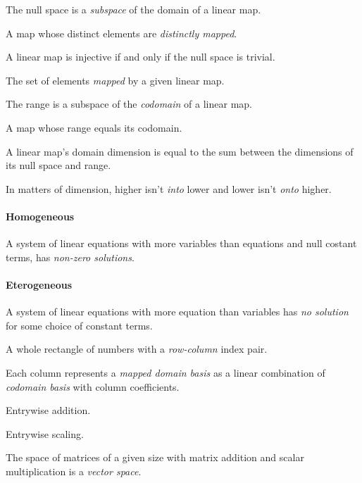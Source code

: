 \begin{multicols}{3}
  The null space is a \textit{subspace} of the domain of a linear map.

  A map whose distinct elements are \textit{distinctly mapped}.

  A linear map is injective if and only if the null space is trivial.

  The set of elements \textit{mapped} by a given linear map.

  The range is a subspace of the \textit{codomain} of a linear map.

  A map whose range equals its codomain.

  A linear map's domain dimension is equal to the sum between the dimensions of its null space and range.

  In matters of dimension, higher isn't \textit{into} lower and lower isn't \textit{onto} higher.

  \paragraph{\textbf{Homogeneous}}
  A system of linear equations with more variables than equations and null costant terms, has \textit{non-zero solutions}.
  
  \paragraph{\textbf{Eterogeneous}}
  A system of linear equations with more equation than variables has \textit{no solution} for some choice of constant terms.
  
  A whole rectangle of numbers with a \textit{row-column} index pair.
  
  Each column represents a \textit{mapped domain basis} as a linear combination of \textit{codomain basis} with column coefficients.

  Entrywise addition.

  Entrywise scaling.
  
  The space of matrices of a given size with matrix addition and scalar multiplication is a \textit{vector space}.
  

\end{multicols}
